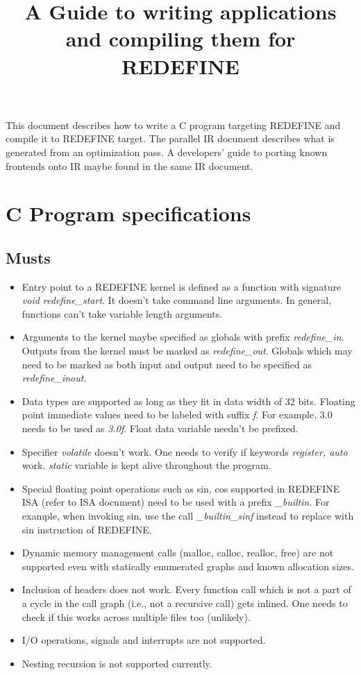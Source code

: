 \documentclass[12pt]{article}
\begin{document}
\title{A Guide to writing applications and compiling them for REDEFINE}
\maketitle
This document describes how to write a C program targeting REDEFINE and compile it to REDEFINE target. The parallel IR document describes what is generated from an optimization pass. A developers' guide to porting known frontends onto IR maybe found in the same IR document. 
\section{C Program specifications}
\subsection{Musts}
\begin{itemize}
 \item Entry point to a REDEFINE kernel is defined as a function with signature \textit{void redefine\_start\(\)}. It doesn't take command line arguments. In general, functions can't take variable length arguments.
 \item Arguments to the kernel maybe specified as globals with prefix \textit{redefine\_in}. Outputs from the kernel must be marked as \textit{redefine\_out}. Globals which may need to be marked as both input and output need to be specified as \textit{redefine\_inout}.
 \item Data types are supported as long as they fit in data width of 32 bits. Floating point immediate values need to be labeled with suffix \textit{f}. For example, 3.0 needs to be used as \textit{3.0f}. Float data variable needn't be prefixed.
 \item Specifier \textit{volatile} doesn't work. One needs to verify if keywords \textit{register, auto} work. \textit{static} variable is kept alive throughout the program. 
  \item Special floating point operations such as sin, cos supported in REDEFINE ISA (refer to ISA document) need to be used with a prefix \textit{\_builtin}. For example, when invoking sin, use the call \textit{\_builtin\_sinf\(\)} instead to replace with sin instruction of REDEFINE.
 \item Dynamic memory management calls (malloc, calloc, realloc, free) are not supported even with statically enumerated graphs and known allocation sizes.
 \item Inclusion of headers does not work. Every function call which is not a part of a cycle in the call graph (i.e., not a recursive call) gets inlined. One needs to check if this works across multiple files too (unlikely). 
 \item I/O operations, signals and interrupts are not supported.
 \item Nesting recursion is not supported currently.
\end{itemize}
\end{document}
